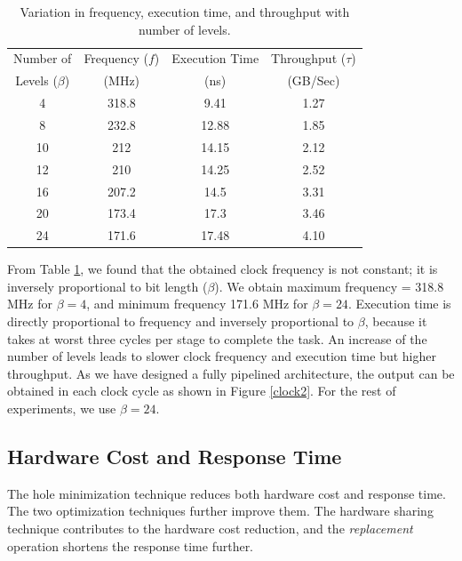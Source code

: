 \documentclass[10pt, conference, compsocconf]{IEEEtran}
\begin{document}
 \begin{table}
 \begin{center}
 \caption{Variation in frequency, execution time, and throughput with number of levels.}
\label{table1}
\begin{tabular}{ |c|c|c|c| }
 \hline
 Number of & Frequency ($f$) & Execution Time& Throughput ($\tau$) \\
 Levels ($\beta$) & (MHz)& (ns)& (GB/Sec)\\
 \hline
 \hline
 4 & 318.8 & 9.41 & 1.27\\
 8 & 232.8 & 12.88 & 1.85\\
 10 & 212 & 14.15 & 2.12 \\
 12 & 210 & 14.25 & 2.52 \\
 16 & 207.2 & 14.5 & 3.31\\
 20 & 173.4 & 17.3 & 3.46 \\
 24 & 171.6 & 17.48 & 4.10\\
 \hline
\end{tabular}
\end{center}
\end{table}

From Table \ref{table1}, we found that the obtained clock frequency is not constant; it is inversely proportional to bit length ($\beta$).
We obtain maximum frequency = 318.8 MHz for $\beta = 4$, and minimum frequency 171.6 MHz for $\beta = 24$.
Execution time is directly proportional to frequency and inversely proportional to $\beta$, because it takes at worst three cycles per stage to complete the task.
An increase of the number of levels leads to slower clock frequency and execution time but higher throughput.
As we have designed a fully pipelined architecture, the output can be obtained in each clock cycle as shown in Figure \ref{clock2}.
For the rest of experiments, we use $\beta = 24$.

\subsection{Hardware Cost and Response Time}

The hole minimization technique reduces both hardware cost and response time.
The two optimization techniques further improve them.
The hardware sharing technique contributes to the hardware cost reduction, and the {\it replacement} operation shortens the response time further.
\end{document}
